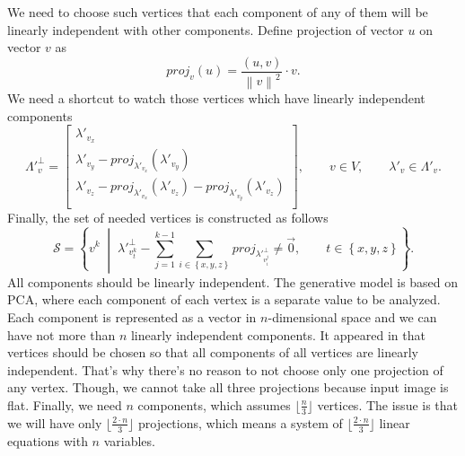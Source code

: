 We need to choose such vertices that each component of any of them
will be linearly independent with other components.
Define projection of vector $u$ on vector $v$ as
\begin{equation*}
  proj_v\left( u \right)
  = \frac{\left( u, v \right)}{\left\| v \right\|^2} \cdot v.
\end{equation*}
We need a shortcut to watch those vertices
which have linearly independent components
\begin{equation*}
  \Lambda'^{\perp}_v = \begin{bmatrix}
    \lambda'_{v_x} \\
    \lambda'_{v_y} - proj_{\lambda'_{v_x}}\left( \lambda'_{v_y} \right) \\
    \lambda'_{v_z} - proj_{\lambda'_{v_x}}\left( \lambda'_{v_z} \right)
                   - proj_{\lambda'_{v_y}}\left( \lambda'_{v_z} \right) \\
  \end{bmatrix},
  \qquad v \in V,
  \qquad \lambda'_v \in \Lambda'_v.
\end{equation*}
Finally, the set of needed vertices is constructed as follows
\begin{equation*}
  \mathcal{S}
  = \left\{ v^k \;\middle|\;
    \lambda'^{\perp}_{v^k_t}
    - \sum_{j = 1}^{k - 1} \sum_{i \in \left\{ x, y, z \right\}}
    proj_{\lambda'^{\perp}_{v^j_i}} \neq \vec{0},
    \qquad t \in \left\{ x, y, z \right\}
  \right\}.
\end{equation*}
All components should be linearly independent.
The generative model is based on PCA,
where each component of each vertex is a separate value to be analyzed.
Each component is represented as a vector in $n$-dimensional space
and we can have not more than $n$ linearly independent components.
It appeared in \label{eq:components:independent}
that vertices should be chosen so that
all components of all vertices are linearly independent.
That's why there's no reason to not choose only one projection of any vertex.
Though, we cannot take all three projections because input image is flat.
Finally, we need $n$ components,
which assumes $\lfloor \frac{n}{3} \rfloor$ vertices.
The issue is that we will have only $\lfloor \frac{2 \cdot n}{3} \rfloor$
projections,
which means a system of $\lfloor \frac{2 \cdot n}{3} \rfloor$ linear equations
with $n$ variables.
